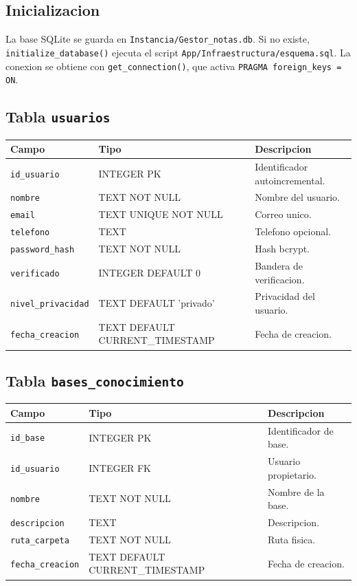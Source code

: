 \documentclass[12pt,a4paper]{article}
\begin{document}
\subsection{Inicializacion}

La base SQLite se guarda en \texttt{Instancia/Gestor\_notas.db}. Si no existe, \texttt{initialize\_database()} ejecuta el script \texttt{App/Infraestructura/esquema.sql}. La conexion se obtiene con \texttt{get\_connection()}, que activa \texttt{PRAGMA foreign\_keys = ON}.

\subsection{Tabla \texttt{usuarios}}

\begin{longtable}{|p{4cm}|p{3cm}|p{7cm}|}
\hline
\textbf{Campo} & \textbf{Tipo} & \textbf{Descripcion} \\
\hline
\texttt{id\_usuario} & INTEGER PK & Identificador autoincremental. \\
\hline
\texttt{nombre} & TEXT NOT NULL & Nombre del usuario. \\
\hline
\texttt{email} & TEXT UNIQUE NOT NULL & Correo unico. \\
\hline
\texttt{telefono} & TEXT & Telefono opcional. \\
\hline
\texttt{password\_hash} & TEXT NOT NULL & Hash bcrypt. \\
\hline
\texttt{verificado} & INTEGER DEFAULT 0 & Bandera de verificacion. \\
\hline
\texttt{nivel\_privacidad} & TEXT DEFAULT 'privado' & Privacidad del usuario. \\
\hline
\texttt{fecha\_creacion} & TEXT DEFAULT CURRENT\_TIMESTAMP & Fecha de creacion. \\
\hline
\end{longtable}

\subsection{Tabla \texttt{bases\_conocimiento}}

\begin{longtable}{|p{4cm}|p{3cm}|p{7cm}|}
\hline
\textbf{Campo} & \textbf{Tipo} & \textbf{Descripcion} \\
\hline
\texttt{id\_base} & INTEGER PK & Identificador de base. \\
\hline
\texttt{id\_usuario} & INTEGER FK & Usuario propietario. \\
\hline
\texttt{nombre} & TEXT NOT NULL & Nombre de la base. \\
\hline
\texttt{descripcion} & TEXT & Descripcion. \\
\hline
\texttt{ruta\_carpeta} & TEXT NOT NULL & Ruta fisica. \\
\hline
\texttt{fecha\_creacion} & TEXT DEFAULT CURRENT\_TIMESTAMP & Fecha de creacion. \\
\hline
\end{longtable}
\end{document}
